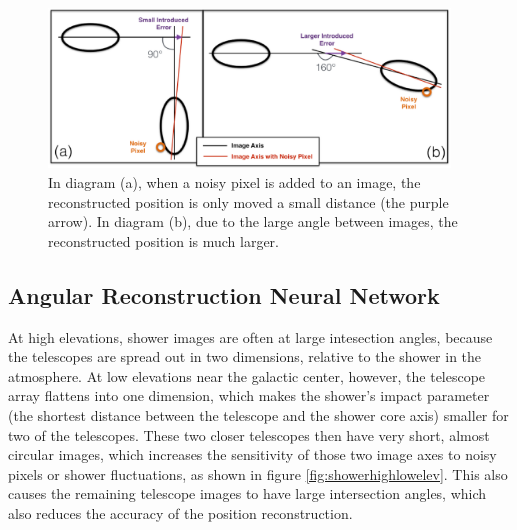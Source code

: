 \begin{figure}[ht]
  \begin{center}
    \includegraphics[width=0.95\textwidth]{images/large_angle_image_intersection_error_cropped.eps}
    \caption[Large Image Intersection Angles]{In diagram (a), when a noisy pixel is added to an image, the reconstructed position is only moved a small distance (the purple arrow).  In diagram (b), due to the large angle between images, the reconstructed position is much larger.}\label{fig:largeintersectangle}
  \end{center}
\end{figure}

\subsection{Angular Reconstruction Neural Network}\label{subsec:disp}
At high elevations, shower images are often at large intesection angles, because the telescopes are spread out in two dimensions, relative to the shower in the atmosphere.
At low elevations near the galactic center, however, the telescope array flattens into one dimension, which makes the shower's impact parameter (the shortest distance between the telescope and the shower core axis) smaller for two of the telescopes.
These two closer telescopes then have very short, almost circular images, which increases the sensitivity of those two image axes to noisy pixels or shower fluctuations, as shown in figure \ref{fig:showerhighlowelev}.
This also causes the remaining telescope images to have large intersection angles, which also reduces the accuracy of the position reconstruction.


